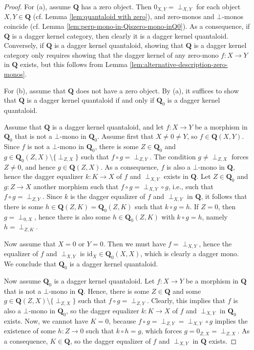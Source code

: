 \documentclass[12pt]{tac}
\theoremstyle{definition}
\theoremstyle{remark}
\newcommand{\<}{\langle}
\renewcommand{\>}{\rangle}
\renewcommand{\:}{\colon}
\newcommand{\id}{\mathrm{id}}
\begin{document}
\begin{proof}
    For (a), assume $\mathbf Q$ has a zero object. Then $0_{X,Y}=\perp_{X,Y}$ for each object $X,Y\in\mathbf Q$ (cf. Lemma \ref{lem:quantaloid with zero}), and zero-monos and $\bot$-monos coincide (cf. Lemma \ref{lem:perp-mono-in-Qiszero-mono-inQ0}). As a consequence, if $\mathbf Q$ is a dagger kernel category, then clearly it is a dagger kernel quantaloid. Conversely, if $\mathbf Q$ is a dagger kernel quantaloid, showing that $\mathbf Q$ is a dagger kernel category only requires showing that the dagger kernel of any zero-mono $f:X\to Y$ in $\mathbf Q$ exists, but this follows from Lemma \ref{lem:alternative-description-zero-monos}. 

    For (b), assume that $\mathbf Q$ does not have a zero object. By (a), it suffices to show that $\mathbf Q$ is a dagger kernel quantaloid if and only if $\mathbf Q_0$ is a dagger kernel quantaloid. 

    Assume that $\mathbf Q$ is a dagger kernel quantaloid, and let $f:X\to Y$ be a morphism in $\mathbf Q_0$ that is not a $\bot$-mono in $\mathbf Q_0$.  Assume first that $X\neq 0\neq Y$, so $f\in\mathbf Q(X,Y)$. Since $f$ is not a $\bot$-mono in $\mathbf Q_0$, there is some $Z\in\mathbf Q_0$ and $g\in\mathbf Q_0(Z,X)\setminus\{\perp_{Z,X}\}$ such that $f\circ g=\perp_{Z,Y}$. The condition $g\neq\perp_{Z,X}$ forces $Z\neq 0$, and hence $g\in \mathbf Q(Z,X)$. As a consequence, $f$ is also a $\bot$-mono in $\mathbf Q$, hence the dagger equalizer $k:K\to X$ of $f$ and $\perp_{X,Y}$ exists in $\mathbf Q$. Let $Z\in\mathbf Q_0$ and $g:Z\to X$ another morphism such that $f\circ g=\perp_{X,Y}\circ g$, i.e., such that $f\circ g=\perp_{Z,Y}$. Since $k$ is the dagger equalizer of $f$ and $\perp_{X,Y}$ in $\mathbf Q$, it follows that there is some $h\in\mathbf Q(Z,K)=\mathbf Q_0(Z,K)$ such that $k\circ g=h$. If $Z=0$, then $g=\perp_{0,X}$, hence there is also some $h\in \mathbf Q_0(Z,K)$ with $k\circ g=h$, namely $h=\perp_{Z,K}$. 

Now assume that $X=0$ or $Y=0$. Then we must have $f=\perp_{X,Y}$, hence the equalizer of $f$ and $\perp_{X,Y}$ is $\id_X\in\mathbf Q_0(X,X)$, which is clearly a dagger mono. We conclude that $\mathbf Q_0$ is a dagger kernel quantaloid.


Now assume $\mathbf Q_0$ is a dagger kernel quantaloid. Let $f:X\to Y$ be a morphism in $\mathbf Q$ that is not a $\bot$-mono in $\mathbf Q$. Hence, there is some $Z\in\mathbf Q$ and some $g\in\mathbf Q(Z,X)\setminus\{\perp_{Z,X}\}$ such that $f\circ g=\perp_{Z,Y}$.
Clearly, this implies that $f$ is also a $\bot$-mono in $\mathbf Q_0$, so the dagger equalizer $k:K\to X$ of $f$ and $\perp_{X,Y}$ in $\mathbf Q_0$ exists. Now, we cannot have $K=0$, because $f\circ g=\perp_{Z,Y}=\perp_{X,Y}\circ g$ implies the existence of some $h:Z\to 0$ such that $k\circ h=g$, which forces $g=0_{Z,X}=\perp_{Z,X}$. As a consequence, $K\in\mathbf Q$, so the dagger equalizer of $f$ and $\perp_{X,Y}$ in $\mathbf Q$ exists.
\end{proof}
\end{document}
